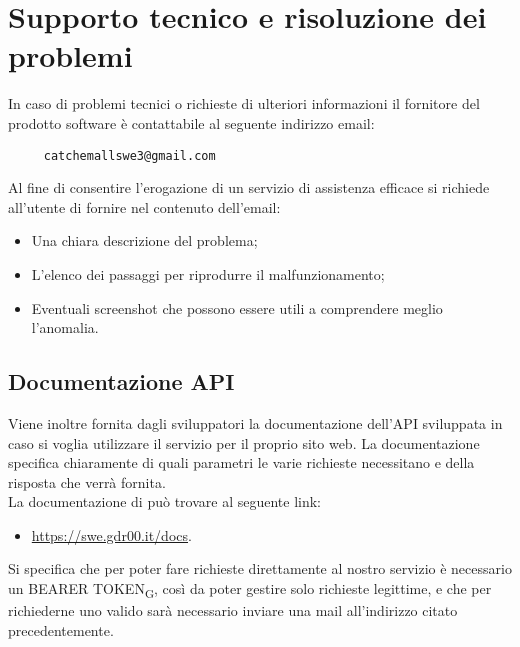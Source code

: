 \section{Supporto tecnico e risoluzione dei problemi}
In caso di problemi tecnici o richieste di ulteriori informazioni il fornitore del prodotto software è contattabile al seguente indirizzo email:
\begin{verbatim}
	 catchemallswe3@gmail.com
\end{verbatim}
 Al fine di consentire l'erogazione di un servizio di assistenza efficace si richiede all'utente di fornire nel contenuto dell'email:
\begin{itemize}
	\item Una chiara descrizione del problema;
	\item L'elenco dei passaggi per riprodurre il malfunzionamento;
    \item Eventuali screenshot che possono essere utili a comprendere meglio l'anomalia.
\end{itemize} 

\subsection{Documentazione API}
Viene inoltre fornita dagli sviluppatori la documentazione dell'API sviluppata in caso si voglia utilizzare il servizio per il proprio sito web. La documentazione specifica chiaramente di quali parametri le varie richieste necessitano e della risposta che verrà fornita.\\
La documentazione di può trovare al seguente link:
\begin{itemize}
	\item \href{https://swe.gdr00.it/docs}{https://swe.gdr00.it/docs}.
\end{itemize}
Si specifica che per poter fare richieste direttamente al nostro servizio è necessario un BEARER TOKEN\textsubscript{G}, così da poter gestire solo richieste legittime, e che per richiederne uno valido sarà necessario inviare una mail all'indirizzo citato precedentemente.
